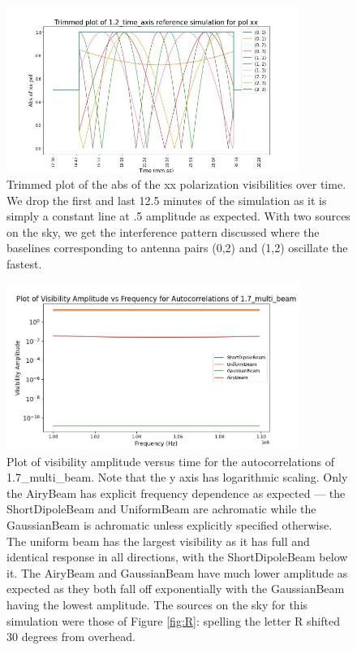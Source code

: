 \documentclass{article}
\begin{document}
\begin{figure}
    \centering
    \includegraphics[width=0.85\textwidth]{documentation_figures/new_horizon_baseline_time.jpg}
    \caption{Trimmed plot of the abs of the xx polarization visibilities over time. We drop the first and last 12.5 minutes of the simulation as it is simply a constant line at .5 amplitude as expected. With two sources on the sky, we get the interference pattern discussed where the baselines corresponding to antenna pairs (0,2) and (1,2) oscillate the fastest.}
    \label{fig:4xb}
\end{figure}
\begin{figure}
    \centering
    \includegraphics[width=0.85\textwidth]{documentation_figures/autocorrelations.jpg}
    \caption{Plot of visibility amplitude versus time for the autocorrelations of 1.7\_multi\_beam. Note that the y axis has logarithmic scaling. Only the AiryBeam has explicit frequency dependence as expected --- the ShortDipoleBeam and UniformBeam are achromatic while the GaussianBeam is achromatic unless explicitly specified otherwise. The uniform beam has the largest visibility as it has full and identical response in all directions, with the ShortDipoleBeam below it. The AiryBeam and GaussianBeam have much lower amplitude as expected as they both fall off exponentially with the GaussianBeam having the lowest amplitude. The sources on the sky for this simulation were those of Figure \ref{fig:R}: spelling the letter R shifted 30 degrees from overhead.}
    \label{fig:autocorr}
\end{figure}
\end{document}
